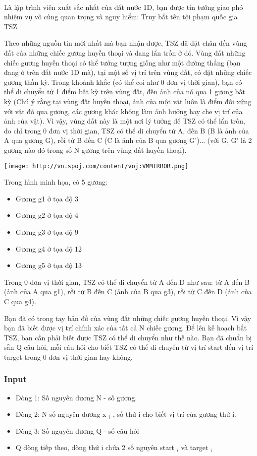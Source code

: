 

 

Là lập trình viên xuất sắc nhất của đất nước 1D, bạn được tin tưởng giao phó nhiệm vụ vô cùng quan trọng và nguy hiểm: Truy bắt tên tội phạm quốc gia TSZ.

Theo những nguồn tin mới nhất mà bạn nhận được, TSZ đã đặt chân đến vùng đất của những chiếc gương huyền thoại và đang lẩn trốn ở đó. Vùng đất những chiếc gương huyền thoại có thể tưởng tượng giống như một đường thẳng (bạn đang ở trên đất nước 1D mà), tại một số vị trí trên vùng đất, có đặt những chiếc gương thần kỳ. Trong khoảnh khắc (có thể coi như 0 đơn vị thời gian), bạn có thể di chuyển từ 1 điểm bất kỳ trên vùng đất, đến ảnh của nó qua 1 gương bất kỳ (Chú ý rằng tại vùng đất huyền thoại, ảnh của một vật luôn là điểm đối xứng với vật đó qua gương, các gương khác không làm ảnh hưởng hay che vị trí của ảnh của vật). Vì vậy, vùng đất này là một nơi lý tưởng để TSZ có thể lẩn trốn, do chỉ trong 0 đơn vị thời gian, TSZ có thể di chuyển từ A, đến B (B là ảnh của A qua gương G), rồi từ B đến C (C là ảnh của B qua gương G')... (với G, G' là 2 gương nào đó trong số N gương trên vùng đất huyền thoại).


\texttt{[image: http://vn.spoj.com/content/voj:VMMIRROR.png]}

Trong hình minh họa, có 5 gương:
\begin{itemize}
	\item Gương g1 ở tọa độ 3
	\item Gương g2 ở tọa độ 4
	\item Gương g3 ở tọa độ 9
	\item Gương g4 ở tọa độ 12
	\item Gương g5 ở tọa độ 13
\end{itemize}

Trong 0 đơn vị thời gian, TSZ có thể di chuyển từ A đến D như sau: từ A đến B (ảnh của A qua g1), rồi từ B đến C (ảnh của B qua g3), rồi từ C đến D (ảnh của C qua g4).

Bạn đã có trong tay bản đồ của vùng đất những chiếc gương huyền thoại. Vì vậy bạn đã biết được vị trí chính xác của tất cả N chiếc gương. Để lên kế hoạch bắt TSZ, bạn cần phải biết được TSZ có thể di chuyển như thế nào. Bạn đã chuẩn bị sẵn Q câu hỏi, mỗi câu hỏi cho biết TSZ có thể di chuyển từ vị trí start đến vị trí target trong 0 đơn vị thời gian hay không.

\subsubsection{Input}
\begin{itemize}
	\item Dòng 1: Số nguyên dương N - số gương.
	\item Dòng 2: N số nguyên dương x $_ i $ , số thứ i cho biết vị trí của gương thứ i.
	\item Dòng 3: Số nguyên dương Q - số câu hỏi
	\item Q dòng tiếp theo, dòng thứ i chứa 2 số nguyên start $_ i $ và target $_ i $
\end{itemize}

